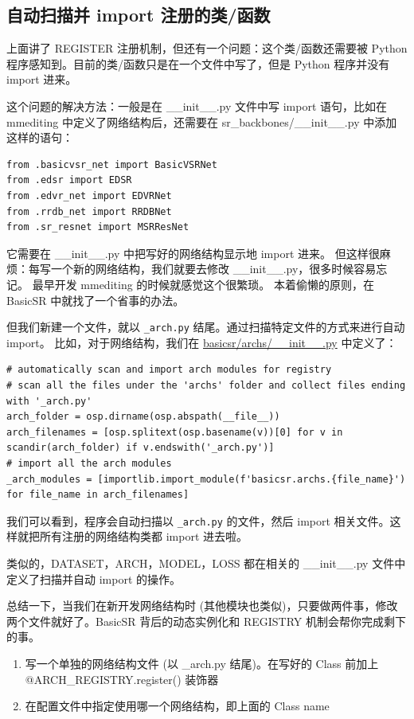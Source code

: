 \documentclass[../main.tex]{subfiles}
\begin{document}
\subsection{自动扫描并 import 注册的类/函数}\label{code_structure:auto_import}

上面讲了 REGISTER 注册机制，但还有一个问题：这个类/函数还需要被 Python 程序感知到。目前的类/函数只是在一个文件中写了，但是 Python 程序并没有 import 进来。

这个问题的解决方法：一般是在 \_\_init\_\_.py 文件中写 import 语句，比如在 mmediting 中定义了网络结构后，还需要在 sr\_backbones/\_\_init\_\_.py 中添加这样的语句：
\begin{verbatim}
from .basicvsr_net import BasicVSRNet
from .edsr import EDSR
from .edvr_net import EDVRNet
from .rrdb_net import RRDBNet
from .sr_resnet import MSRResNet
\end{verbatim}

它需要在 \_\_init\_\_.py 中把写好的网络结构显示地 import 进来。
但这样很麻烦：每写一个新的网络结构，我们就要去修改 \_\_init\_\_.py，很多时候容易忘记。
最早开发 mmediting 的时候就感觉这个很繁琐。
本着偷懒的原则，在 BasicSR 中就找了一个省事的办法。

但我们新建一个文件，就以 \texttt{\_arch.py} 结尾。通过扫描特定文件的方式来进行自动 import。
比如，对于网络结构，我们在 \href{https://github.com/XPixelGroup/BasicSR/blob/master/basicsr/archs/\_\_init\_\_.py}{basicsr/archs/\_\_init\_\_.py} 中定义了：

\begin{verbatim}
# automatically scan and import arch modules for registry
# scan all the files under the 'archs' folder and collect files ending with '_arch.py'
arch_folder = osp.dirname(osp.abspath(__file__))
arch_filenames = [osp.splitext(osp.basename(v))[0] for v in scandir(arch_folder) if v.endswith('_arch.py')]
# import all the arch modules
_arch_modules = [importlib.import_module(f'basicsr.archs.{file_name}') for file_name in arch_filenames]
\end{verbatim}

我们可以看到，程序会自动扫描以 \texttt{\_arch.py} 的文件，然后 import 相关文件。这样就把所有注册的网络结构类都 import 进去啦。

类似的，DATASET，ARCH，MODEL，LOSS 都在相关的 \_\_init\_\_.py 文件中定义了扫描并自动 import 的操作。

总结一下，当我们在新开发网络结构时 (其他模块也类似)，只要做两件事，修改两个文件就好了。BasicSR 背后的动态实例化和 REGISTRY 机制会帮你完成剩下的事。
 \begin{enumerate}
    \item 写一个单独的网络结构文件 (以 \_arch.py 结尾)。在写好的 Class 前加上 @ARCH\_REGISTRY.register() 装饰器
    \item 在配置文件中指定使用哪一个网络结构，即上面的 Class name
\end{enumerate}
\end{document}
